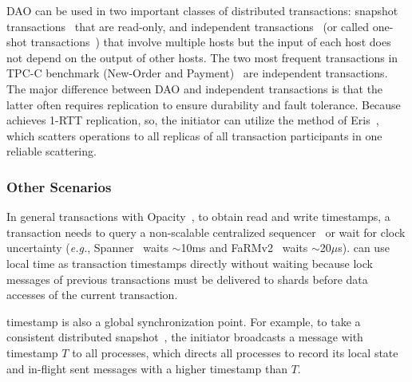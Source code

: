 DAO can be used in two important classes of distributed transactions: snapshot transactions~\cite{corbett2013spanner} that are read-only, and independent transactions~\cite{eris} (or called one-shot transactions~\cite{kallman2008h}) that involve multiple hosts but the input of each host does not depend on the output of other hosts.
The two most frequent transactions in TPC-C benchmark (New-Order and Payment)~\cite{tpcc} are independent transactions.
The major difference between DAO and independent transactions is that the latter often requires replication to ensure durability and fault tolerance.
Because \sys{} achieves 1-RTT replication, so, the initiator can utilize the method of Eris~\cite{eris}, which scatters operations to all replicas of all transaction participants in one reliable scattering.~


\subsubsection{Other Scenarios}

In general transactions with Opacity~\cite{shamis2019fast}, to obtain read and write timestamps, a transaction needs to query a non-scalable centralized sequencer~\cite{dragojevic2015no,kaminsky2016design} or wait for clock uncertainty (\textit{e.g.}, Spanner~\cite{corbett2013spanner} waits $\sim$10ms and FaRMv2~\cite{shamis2019fast} waits $\sim$20$\mu$s). \sys{} can use local time as transaction timestamps directly without waiting because lock messages of previous transactions must be delivered to shards before data accesses of the current transaction.

\sys{} timestamp is also a global synchronization point.
For example, to take a consistent distributed snapshot~\cite{chandy1985distributed}, the initiator broadcasts a message with timestamp $T$ to all processes, which directs all processes to record its local state and in-flight sent messages with a higher timestamp than $T$.





